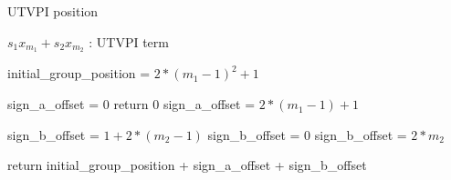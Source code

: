 \begin{algorithm}
  \caption{UTVPI position}
  \linespread{\separationline}\selectfont
  \begin{algorithmic}[2]
     { $s_1 x_{m_1} + s_2 x_{m_2}$ : UTVPI term}

    \State initial\_group\_position = $2*(m_1 -1)^2 + 1$

    \State sign\_a\_offset = 0
    \Else
    \State return 0
    \Else
    \State sign\_a\_offset = $2*(m_1 - 1) + 1$
    \EndIf
    \EndIf
    \EndIf

    \State sign\_b\_offset = $1 + 2*(m_2 -1)$
    \Else
    \State sign\_b\_offset = 0
    \Else
    \State sign\_b\_offset = $2*m_2$
    \EndIf
    \EndIf
    \EndIf

    \State return initial\_group\_position + sign\_a\_offset + sign\_b\_offset

    \EndProcedure
  \end{algorithmic}

\end{algorithm}

